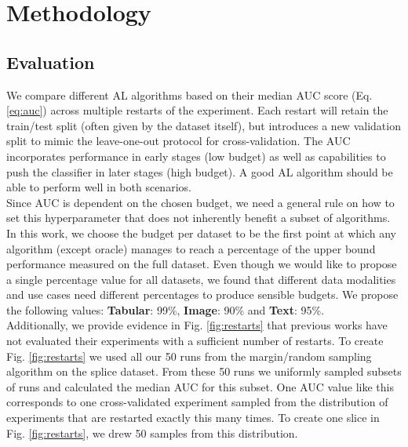 \documentclass[]{article}
\begin{document}
\section{Methodology}

\subsection{Evaluation}\label{sec:evaluation}
We compare different AL algorithms based on their median AUC score (Eq. \ref{eq:auc}) across multiple restarts of the experiment.
Each restart will retain the train/test split (often given by the dataset itself), but introduces a new validation split to mimic the leave-one-out protocol for cross-validation.
The AUC incorporates performance in early stages (low budget) as well as capabilities to push the classifier in later stages (high budget).
A good AL algorithm should be able to perform well in both scenarios. \\ [1mm]
Since AUC is dependent on the chosen budget, we need a general rule on how to set this hyperparameter that does not inherently benefit a subset of algorithms.
In this work, we choose the budget per dataset to be the first point at which any algorithm (except oracle) manages to reach a percentage of the upper bound performance measured on the full dataset.
Even though we would like to propose a single percentage value for all datasets, we found that different data modalities and use cases need different percentages to produce sensible budgets.
We propose the following values: \textbf{Tabular}: 99\%, \textbf{Image}: 90\% and \textbf{Text}: 95\%. \\ [1mm]
Additionally, we provide evidence in Fig. \ref{fig:restarts} that previous works have not evaluated their experiments with a sufficient number of restarts.
To create Fig. \ref{fig:restarts} we used all our 50 runs from the margin/random sampling algorithm on the splice dataset.
From these 50 runs we uniformly sampled subsets of runs and calculated the median AUC for this subset.
One AUC value like this corresponds to one cross-validated experiment sampled from the distribution of experiments that are restarted exactly this many times.
To create one slice in Fig. \ref{fig:restarts}, we drew 50 samples from this distribution.
\end{document}
